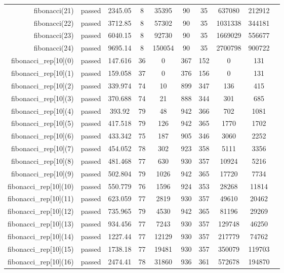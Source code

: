 \begin{longtable}{r|ccccccccc}
    fibonacci(21) & passed & 2345.05 & 8 & 35395 & 90 & 35 & 637080 & 212912 \\
    fibonacci(22) & passed & 3712.85 & 8 & 57302 & 90 & 35 & 1031338 & 344181 \\
    fibonacci(23) & passed & 6040.15 & 8 & 92730 & 90 & 35 & 1669029 & 556677 \\
    fibonacci(24) & passed & 9695.14 & 8 & 150054 & 90 & 35 & 2700798 & 900722 \\
    fibonacci\_rep[10](0) & passed & 147.616 & 36 & 0 & 367 & 152 & 0 & 131 \\
    fibonacci\_rep[10](1) & passed & 159.058 & 37 & 0 & 376 & 156 & 0 & 131 \\
    fibonacci\_rep[10](2) & passed & 339.974 & 74 & 10 & 899 & 347 & 136 & 415 \\
    fibonacci\_rep[10](3) & passed & 370.688 & 74 & 21 & 888 & 344 & 301 & 685 \\
    fibonacci\_rep[10](4) & passed & 393.92 & 79 & 48 & 942 & 366 & 702 & 1081 \\
    fibonacci\_rep[10](5) & passed & 417.518 & 79 & 126 & 942 & 365 & 1770 & 1702 \\
    fibonacci\_rep[10](6) & passed & 433.342 & 75 & 187 & 905 & 346 & 3060 & 2252 \\
    fibonacci\_rep[10](7) & passed & 454.052 & 78 & 302 & 923 & 358 & 5111 & 3356 \\
    fibonacci\_rep[10](8) & passed & 481.468 & 77 & 630 & 930 & 357 & 10924 & 5216 \\
    fibonacci\_rep[10](9) & passed & 502.804 & 79 & 1026 & 942 & 365 & 17720 & 7734 \\
    fibonacci\_rep[10](10) & passed & 550.779 & 76 & 1596 & 924 & 353 & 28268 & 11814 \\
    fibonacci\_rep[10](11) & passed & 623.059 & 77 & 2819 & 930 & 357 & 49610 & 20462 \\
    fibonacci\_rep[10](12) & passed & 735.965 & 79 & 4530 & 942 & 365 & 81196 & 29269 \\
    fibonacci\_rep[10](13) & passed & 934.456 & 77 & 7243 & 930 & 357 & 129748 & 46250 \\
    fibonacci\_rep[10](14) & passed & 1227.44 & 77 & 12129 & 930 & 357 & 217779 & 74762 \\
    fibonacci\_rep[10](15) & passed & 1738.18 & 77 & 19481 & 930 & 357 & 350079 & 119703 \\
    fibonacci\_rep[10](16) & passed & 2474.41 & 78 & 31860 & 936 & 361 & 572678 & 194870 \\

\end{longtable}
